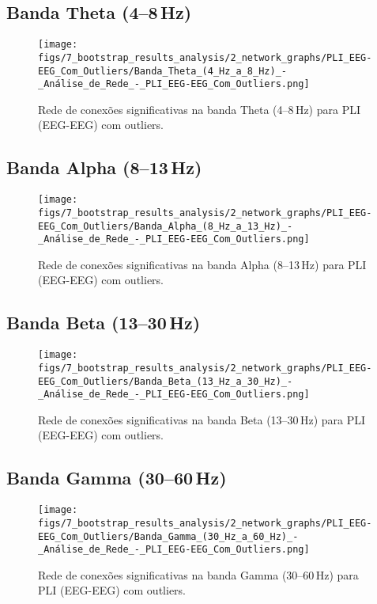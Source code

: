 \begin{apendicesenv}
    \subsection{Banda Theta (4--8\,Hz)}
    \begin{figure}[H]
      \centering
      \texttt{[image: figs/7\_bootstrap\_results\_analysis/2\_network\_graphs/PLI\_EEG-EEG\_Com\_Outliers/Banda\_Theta\_(4\_Hz\_a\_8\_Hz)\_-\_Análise\_de\_Rede\_-\_PLI\_EEG-EEG\_Com\_Outliers.png]}
      \caption{Rede de conexões significativas na banda Theta (4--8\,Hz) para PLI (EEG-EEG) com outliers.}
      \label{fig:apend_pli_theta_com}
    \end{figure}
    
    \subsection{Banda Alpha (8--13\,Hz)}
    \begin{figure}[H]
      \centering
      \texttt{[image: figs/7\_bootstrap\_results\_analysis/2\_network\_graphs/PLI\_EEG-EEG\_Com\_Outliers/Banda\_Alpha\_(8\_Hz\_a\_13\_Hz)\_-\_Análise\_de\_Rede\_-\_PLI\_EEG-EEG\_Com\_Outliers.png]}
      \caption{Rede de conexões significativas na banda Alpha (8--13\,Hz) para PLI (EEG-EEG) com outliers.}
      \label{fig:apend_pli_alpha_com}
    \end{figure}
    
    \subsection{Banda Beta (13--30\,Hz)}
    \begin{figure}[H]
      \centering
      \texttt{[image: figs/7\_bootstrap\_results\_analysis/2\_network\_graphs/PLI\_EEG-EEG\_Com\_Outliers/Banda\_Beta\_(13\_Hz\_a\_30\_Hz)\_-\_Análise\_de\_Rede\_-\_PLI\_EEG-EEG\_Com\_Outliers.png]}
      \caption{Rede de conexões significativas na banda Beta (13--30\,Hz) para PLI (EEG-EEG) com outliers.}
      \label{fig:apend_pli_beta_com}
    \end{figure}
    
    \subsection{Banda Gamma (30--60\,Hz)}
    \begin{figure}[H]
      \centering
      \texttt{[image: figs/7\_bootstrap\_results\_analysis/2\_network\_graphs/PLI\_EEG-EEG\_Com\_Outliers/Banda\_Gamma\_(30\_Hz\_a\_60\_Hz)\_-\_Análise\_de\_Rede\_-\_PLI\_EEG-EEG\_Com\_Outliers.png]}
      \caption{Rede de conexões significativas na banda Gamma (30--60\,Hz) para PLI (EEG-EEG) com outliers.}
      \label{fig:apend_pli_gamma_com}
    \end{figure}
    

\end{apendicesenv}
